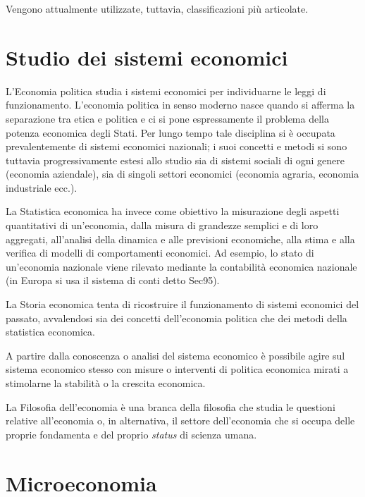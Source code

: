 Vengono attualmente utilizzate, tuttavia, classificazioni più articolate.

\section{Studio dei sistemi economici}


L'Economia politica studia i sistemi economici per individuarne le leggi di 
funzionamento. L'economia politica in senso moderno nasce quando si afferma 
la separazione tra etica e politica e ci si pone espressamente il problema 
della potenza economica degli Stati. Per lungo tempo tale disciplina 
si è occupata prevalentemente di sistemi economici nazionali;
i suoi concetti e metodi si sono tuttavia 
progressivamente estesi allo studio sia di sistemi sociali di ogni genere 
(economia aziendale), sia di singoli settori economici (economia 
agraria, economia industriale ecc.).

La Statistica economica ha invece come obiettivo la misurazione degli 
aspetti quantitativi di un'economia, dalla misura di grandezze semplici e di 
loro aggregati, all'analisi della dinamica e alle previsioni economiche, alla 
stima e alla verifica di modelli di comportamenti economici. Ad esempio, lo 
stato di un'economia nazionale viene rilevato mediante la contabilità 
economica nazionale (in Europa si usa il sistema di conti detto Sec95).

La Storia economica tenta di ricostruire il funzionamento di sistemi 
economici del passato, avvalendosi sia dei concetti dell'economia politica 
che dei metodi della statistica economica.

A partire dalla conoscenza o analisi del sistema economico è possibile agire 
sul sistema economico stesso con misure o interventi di politica economica 
mirati a stimolarne la stabilità o la crescita economica.

La Filosofia dell'economia è una branca della filosofia che studia le 
questioni relative all'economia o, in alternativa, il settore dell'economia 
che si occupa delle proprie fondamenta e del proprio \emph{status} di scienza 
umana.

\section{Microeconomia}
\label{sec:modelli_microeconomia}

